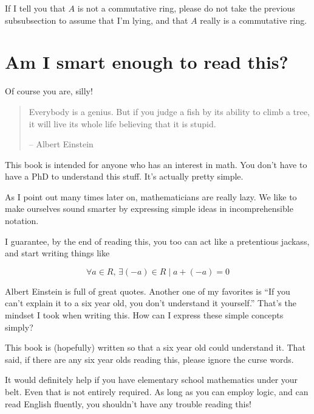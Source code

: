 If I tell you that $A$ is not a commutative ring, please do not take the
previous subsubsection to assume that I'm lying, and that $A$ really is a
commutative ring.
\section{Am I smart enough to read this?}

Of course you are, silly! 

\begin{quotation}
  Everybody is a genius. But if you judge a fish by its ability to climb a tree,
  it will live its whole life believing that it is stupid.
  
  -- Albert Einstein
\end{quotation}

This book is intended for anyone who has an interest in math. You don't have to
have a PhD to understand this stuff. It's actually pretty simple.

As I point out many times later on, mathematicians are really lazy. We like to
make ourselves sound smarter by expressing simple ideas in incomprehensible
notation.

I guarantee, by the end of reading this, you too can act like a pretentious
jackass, and start writing things like

$$\forall a \in R,\, \exists (-a) \in R \mid a + (-a) = 0$$

Albert Einstein is full of great quotes. Another one of my favorites is ``If you
can't explain it to a six year old, you don't understand it yourself.'' That's
the mindset I took when writing this. How can I express these simple concepts
simply?

This book is (hopefully) written so that a six year old could understand
it. That said, if there are any six year olds reading this, please ignore the
curse words.

It would definitely help if you have elementary school mathematics under your
belt. Even that is not entirely required. As long as you can employ logic, and
can read English fluently, you shouldn't have any trouble reading this!
